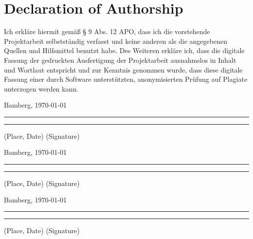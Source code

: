 \documentclass[a4paper]{article}
\begin{document}
\newpage
{\parindent 0cm
\section*{Declaration of Authorship}
Ich erkläre hiermit gemäß § 9 Abs. 12 APO, dass ich die vorstehende Projektarbeit selbstständig verfasst und keine anderen als die angegebenen Quellen und Hilfsmittel benutzt habe. Des Weiteren erkläre ich, dass die digitale Fassung der gedruckten Ausfertigung der Projektarbeit ausnahmslos in Inhalt und Wortlaut entspricht und zur Kenntnis genommen wurde, dass diese digitale Fassung einer durch Software unterstützten, anonymisierten Prüfung auf Plagiate unterzogen werden kann.\\
\vspace{2\baselineskip}
  
Bamberg, \today

\rule[0.5em]{14em}{0.5pt} \hspace{0.25\linewidth}\rule[0.5em]{14em}{0.5pt}
\vspace{1em}
\hspace{4em} (Place, Date) \hspace{0.51\linewidth} (Signature)

Bamberg, \today

\rule[0.5em]{14em}{0.5pt} \hspace{0.25\linewidth}\rule[0.5em]{14em}{0.5pt}
\vspace{1em}
\hspace{4em} (Place, Date) \hspace{0.51\linewidth} (Signature)

Bamberg, \today

\rule[0.5em]{14em}{0.5pt} \hspace{0.25\linewidth}\rule[0.5em]{14em}{0.5pt}
\vspace{1em}
\hspace{4em} (Place, Date) \hspace{0.51\linewidth} (Signature)
}






\newpage
\appendix

\end{document}
